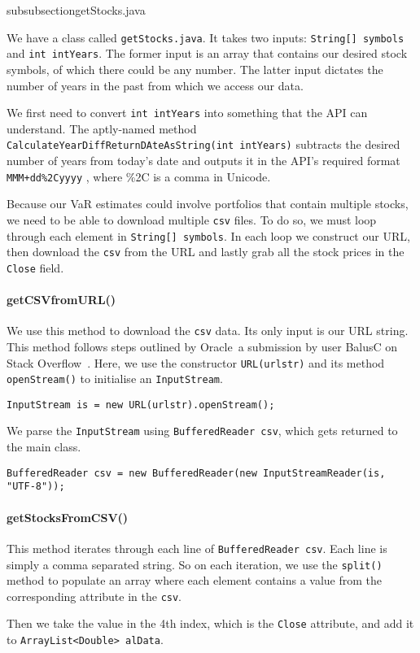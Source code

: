 \documentclass[../Dissertation.tex]{subfiles}
\begin{document}
subsubsection{getStocks.java}

We have a class called \lstinline|getStocks.java|.
It takes two inputs: \lstinline|String[] symbols| and \lstinline|int intYears|.
The former input is an array that contains our desired stock symbols, of which there could be any number.
The latter input dictates the number of years in the past from which we access our data.

We first need to convert \lstinline|int intYears| into something that the API can understand.
The aptly-named method \lstinline|CalculateYearDiffReturnDAteAsString(int intYears)| subtracts the desired number of years from today's date and outputs it in the API's required format \lstinline|MMM+dd%2Cyyyy|
, where \%2C is a comma in Unicode.

Because our VaR estimates could involve portfolios that contain multiple stocks, we need to be able to download multiple \lstinline|csv| files.
To do so, we must loop through each element in \lstinline|String[] symbols|.
In each loop we construct our URL, then download the \lstinline|csv| from the URL and lastly grab all the stock prices in the \lstinline|Close| field.

\paragraph{getCSVfromURL()}

We use this method to download the \lstinline|csv| data. 
Its only input is our URL string.
This method follows steps outlined by Oracle~\cite{Oracle:2015}a submission by user BalusC on Stack Overflow~\cite{BalusC:2010a}.
Here, we use the constructor \lstinline|URL(urlstr)| and its method \lstinline|openStream()| to initialise an \lstinline|InputStream|.
\begin{lstlisting}[firstnumber = 16]
InputStream is = new URL(urlstr).openStream();
\end{lstlisting}
We parse the \lstinline|InputStream| using \lstinline|BufferedReader csv|, which gets returned to the main class.
\begin{lstlisting}[firstnumber = 18]
BufferedReader csv = new BufferedReader(new InputStreamReader(is, "UTF-8"));
\end{lstlisting}

\paragraph{getStocksFromCSV()}

This method iterates through each line of \lstinline|BufferedReader csv|.
Each line is simply a comma separated string. 
So on each iteration, we use the \lstinline|split()| method to populate an array where each element contains a value from the corresponding attribute in the \lstinline|csv|.

Then we take the value in the 4th index, which is the \lstinline|Close| attribute, and add it to \lstinline|ArrayList<Double> alData|.

\end{document}
